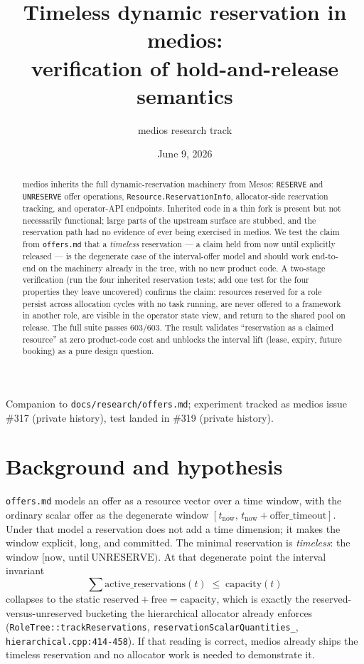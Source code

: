 \documentclass[11pt]{article}
\title{Timeless dynamic reservation in medios:\\
verification of hold-and-release semantics}
\author{medios research track}
\date{June 9, 2026}
\newcommand{\code}[1]{\texttt{#1}}
\begin{document}
\maketitle

\begin{center}
\small Companion to \code{docs/research/offers.md}; experiment tracked as
medios issue \#317 (private history),
test landed in \#319 (private history).
\end{center}

\begin{abstract}
medios inherits the full dynamic-reservation machinery from Mesos:
\code{RESERVE} and \code{UNRESERVE} offer operations,
\code{Resource.ReservationInfo}, allocator-side reservation tracking, and
operator-API endpoints. Inherited code in a thin fork is present but not
necessarily functional; large parts of the upstream surface are stubbed, and
the reservation path had no evidence of ever being exercised in medios. We
test the claim from \code{offers.md} that a \emph{timeless} reservation ---
a claim held from now until explicitly released --- is the degenerate case
of the interval-offer model and should work end-to-end on the machinery
already in the tree, with no new product code. A two-stage verification (run
the four inherited reservation tests; add one test for the four properties
they leave uncovered) confirms the claim: resources reserved for a role
persist across allocation cycles with no task running, are never offered to
a framework in another role, are visible in the operator state view, and
return to the shared pool on release. The full suite passes 603/603. The
result validates ``reservation as a claimed resource'' at zero product-code
cost and unblocks the interval lift (lease, expiry, future booking) as a
pure design question.
\end{abstract}

\section{Background and hypothesis}

\code{offers.md} models an offer as a resource vector over a time window,
with the ordinary scalar offer as the degenerate window
$[t_{\mathrm{now}},\, t_{\mathrm{now}} + \mathrm{offer\_timeout}]$. Under
that model a reservation does not add a time dimension; it makes the window
explicit, long, and committed. The minimal reservation is \emph{timeless}:
the window $[\mathrm{now},\, \mathrm{until\ UNRESERVE})$. At that degenerate
point the interval invariant
\begin{equation*}
\sum \mathrm{active\_reservations}(t) \;\le\; \mathrm{capacity}(t)
\end{equation*}
collapses to the static $\mathrm{reserved} + \mathrm{free} =
\mathrm{capacity}$, which is exactly the reserved-versus-unreserved
bucketing the hierarchical allocator already enforces
(\code{RoleTree::trackReservations},
\code{reservationScalarQuantities\_}, \code{hierarchical.cpp:414-458}). If
that reading is correct, medios already ships the timeless reservation and
no allocator work is needed to demonstrate it.
\end{document}
